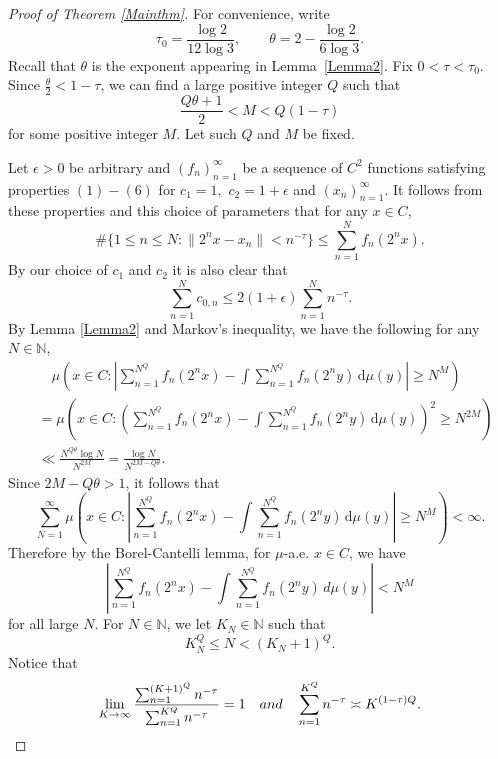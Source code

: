 \documentclass[10pt,a4paper]{amsart}
\numberwithin{equation}{section} %
\begin{document}
\begin{proof}[Proof of Theorem \ref{Mainthm}]
	For convenience, write 
	\[\tau_0=\frac{\log2}{12\log3},\qquad \theta=2-\frac{\log2}{6\log3}.\]
	Recall that $\theta$ is the exponent appearing in Lemma~\ref{Lemma2}. Fix $0<\tau<\tau_0$. %
    Since $\frac{\theta}{2}<1-\tau$,
	we can find a large positive integer $Q$ such that 
	\[\frac{Q\theta+1}{2}<M<Q(1-\tau)\]
	for some positive integer $M$. Let such $Q$ and $M$ be fixed. 
	
	
	Let $\epsilon>0$ be arbitrary and $(f_n)_{n=1}^{\infty}$ be a sequence of $C^2$ functions satisfying properties $(1)-(6)$ for $c_{1}=1,$ $c_{2}=1+\epsilon$ and $(x_{n})_{n=1}^{\infty}$. It follows from these properties and this choice of parameters that for any $x\in C$,
	\begin{equation}
		\label{Counting upper bound}
		\#\{1\leq n\leq N:\|2^{n}x-x_n\|< n^{-\tau}\}\leq \sum_{n=1}^{N}f_{n}(2^{n}x).
	\end{equation}
	By our choice of $c_{1}$ and $c_{2}$ it is also clear that 
	\begin{equation}
		\label{abequation}
		\sum_{n=1}^{N}c_{0,n}\leq 2(1+\epsilon)\sum_{n=1}^{N}n^{-\tau}.
	\end{equation}
	By Lemma \ref{Lemma2} and Markov's inequality, we have the following for any $N\in\mathbb{N}$,
	\begin{align*}
		&\quad\mu\left(x\in C:\left|\sum_{n=1}^{N^{Q}}f_{n}(2^{n}x)-\int \sum_{n=1}^{N^{Q}}f_{n}(2^ny)\, \mathrm{d}\mu(y)\right|\geq N^{M}\right)\\
		&=\mu\left(x\in C:\left(\sum_{n=1}^{N^{Q}}f_{n}(2^{n}x)-\int \sum_{n=1}^{N^{Q}}f_{n}(2^ny)\, \mathrm{d}\mu(y)\right)^{2}\geq N^{2M}\right)\\
		&\ll \frac{N^{ Q\theta}\log N}{N^{2M}}
		=\frac{\log N}{N^{2M-Q\theta}}.
	\end{align*}
	Since $2M-Q\theta>1$, it follows that
	$$\sum_{N=1}^{\infty}\mu\left(x\in C:\left|\sum_{n=1}^{N^{Q}}f_{n}(2^{n}x)-\int \sum_{n=1}^{N^{Q}}f_{n}(2^ny)\, \mathrm{d}\mu(y)\right|\geq N^{M}\right)<\infty.$$
	Therefore by the  Borel-Cantelli lemma, for $\mu$-a.e. $x\in C$, we have 
	\begin{equation}
		\label{eventually}
		\left|\sum_{n=1}^{N^{Q}}f_{n}(2^{n}x)-\int \sum_{n=1}^{N^{Q}}f_{n}(2^ny)\, d\mu(y)\right|<N^{M}
	\end{equation} 
	for all large $N$. For $N\in\mathbb{N}$, we let $K_{N}\in\mathbb{N}$ such that
    \begin{equation}\label{defKN}
    K_{N}^{Q}\leq N< (K_{N}+1)^{Q}. 
    \end{equation}
	  Notice that
	\begin{equation}
		\label{Kasymptotics}\lim_{K\to\infty}\frac{\sum_{n=1}^{(K+1)^{Q}}n^{-\tau}}{\sum_{n=1}^{K^{Q}}n^{-\tau}}=1\quad {\rm and }\quad \sum_{n=1}^{K^{Q}}n^{-\tau}\asymp K^{(1-\tau)Q}.
	\end{equation} 
	 

\end{proof}
\end{document}

